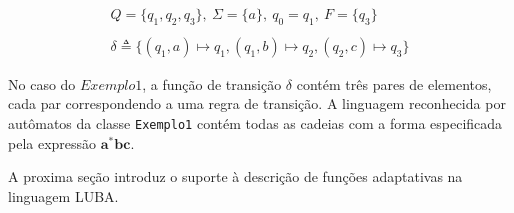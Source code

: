 	\begin{align*}
	Q = \{q_1, q_2, q_3\},\ \Sigma = \{a\},\ q_0 = q_1,\ F = \{ q_3\} \\
	\\
	\delta \triangleq \{ (q_1, a) \mapsto q_1, (q_1, b) \mapsto q_2, (q_2, c) \mapsto q_3 \} \tag{i}\label{d1-transicao}
	\end{align*}

\noindent
No caso do $\mathit{Exemplo1}$, a função de transição $\delta$ contém três pares de elementos, cada par correspondendo a uma regra de transição. A linguagem reconhecida por autômatos da classe \lstinline!Exemplo1! contém todas as cadeias com a forma especificada pela expressão $\mathbf{a^*bc}$.

A proxima seção introduz o suporte à descrição de funções adaptativas na linguagem LUBA.

